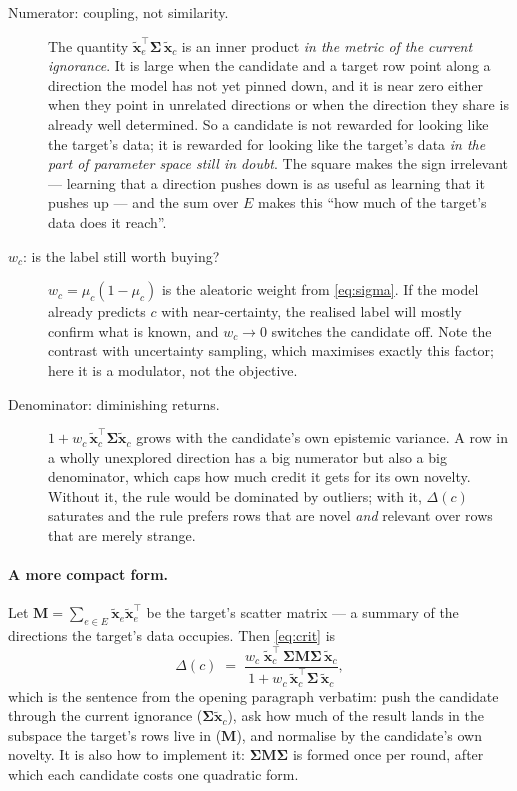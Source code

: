 \documentclass[11pt]{article}
\newcommand{\bx}{\bm{x}}
\newcommand{\bS}{\bm{\Sigma}}
\newcommand{\bM}{\bm{M}}
\begin{document}
\begin{description}
  \item[Numerator: coupling, not similarity.] The quantity
        $\tilde{\bx}_e^{\!\top}\bS\,\tilde{\bx}_c$ is an inner product \emph{in the metric of
        the current ignorance}. It is large when the candidate and a target row point along a
        direction the model has not yet pinned down, and it is near zero either when they point
        in unrelated directions or when the direction they share is already well determined.
        So a candidate is not rewarded for looking like the target's data; it is rewarded for
        looking like the target's data \emph{in the part of parameter space still in doubt}. The
        square makes the sign irrelevant --- learning that a direction pushes down is as useful
        as learning that it pushes up --- and the sum over $E$ makes this ``how much of the
        target's data does it reach''.
  \item[$w_c$: is the label still worth buying?] $w_c = \mu_c(1-\mu_c)$ is the aleatoric weight
        from \eqref{eq:sigma}. If the model already predicts $c$ with near-certainty, the
        realised label will mostly confirm what is known, and $w_c \to 0$ switches the candidate
        off. Note the contrast with uncertainty sampling, which maximises exactly this factor;
        here it is a modulator, not the objective.
  \item[Denominator: diminishing returns.] $1 + w_c\,\tilde{\bx}_c^{\!\top}\bS\tilde{\bx}_c$
        grows with the candidate's own epistemic variance. A row in a wholly unexplored direction
        has a big numerator but also a big denominator, which caps how much credit it gets for
        its own novelty. Without it, the rule would be dominated by outliers; with it,
        $\Delta(c)$ saturates and the rule prefers rows that are novel \emph{and} relevant over
        rows that are merely strange.
\end{description}

\paragraph{A more compact form.} Let $\bM = \sum_{e\in E}\tilde{\bx}_e\tilde{\bx}_e^{\!\top}$ be
the target's scatter matrix --- a summary of the directions the target's data occupies. Then
\eqref{eq:crit} is
\begin{equation}
  \Delta(c) \;=\; \frac{w_c\;\tilde{\bx}_c^{\!\top}\,\bS\bM\bS\,\tilde{\bx}_c}
                       {1 + w_c\,\tilde{\bx}_c^{\!\top}\bS\,\tilde{\bx}_c},
  \label{eq:scatter}
\end{equation}
which is the sentence from the opening paragraph verbatim: push the candidate through the current
ignorance ($\bS\tilde{\bx}_c$), ask how much of the result lands in the subspace the target's
rows live in ($\bM$), and normalise by the candidate's own novelty. It is also how to implement
it: $\bS\bM\bS$ is formed once per round, after which each candidate costs one quadratic form.
\end{document}
